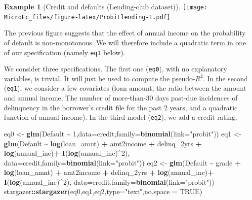 \documentclass[
  12pt,
]{book}
\newenvironment{Shaded}{\begin{snugshade}}{\end{snugshade}}
\newcommand{\AttributeTok}[1]{\textcolor[rgb]{0.13,0.29,0.53}{#1}}
\newcommand{\ConstantTok}[1]{\textcolor[rgb]{0.56,0.35,0.01}{#1}}
\newcommand{\DecValTok}[1]{\textcolor[rgb]{0.00,0.00,0.81}{#1}}
\newcommand{\FunctionTok}[1]{\textcolor[rgb]{0.13,0.29,0.53}{\textbf{#1}}}
\newcommand{\NormalTok}[1]{#1}
\newcommand{\OtherTok}[1]{\textcolor[rgb]{0.56,0.35,0.01}{#1}}
\newcommand{\SpecialCharTok}[1]{\textcolor[rgb]{0.81,0.36,0.00}{\textbf{#1}}}
\newcommand{\StringTok}[1]{\textcolor[rgb]{0.31,0.60,0.02}{#1}}
\theoremstyle{definition}
\theoremstyle{definition}
\newtheorem{example}{Example}[chapter]
\theoremstyle{definition}
\theoremstyle{definition}
\theoremstyle{remark}
\begin{document}
\begin{example}[Credit and defaults (Lending-club dataset)]
\texttt{[image: MicroEc\_files/figure-latex/Probitlending-1.pdf]}

The previous figure suggests that the effect of annual income on the probability of default is non-monotonous. We will therefore include a quadratic term in one of our specification (namely \texttt{eq1} below).

We consider three specifications. The first one (\texttt{eq0}), with no explanatory variables, is trivial. It will just be used to compute the pseudo-\(R^2\). In the second (\texttt{eq1}), we consider a few covariates (loan amount, the ratio between the amount and annual income, The number of more-than-30 days past-due incidences of delinquency in the borrower's credit file for the past 2 years, and a quadratic function of annual income). In the third model (\texttt{eq2}), we add a credit rating.

\begin{Shaded}
\begin{Highlighting}[]
\NormalTok{eq0 }\OtherTok{\textless{}{-}} \FunctionTok{glm}\NormalTok{(Default }\SpecialCharTok{\textasciitilde{}} \DecValTok{1}\NormalTok{,}\AttributeTok{data=}\NormalTok{credit,}\AttributeTok{family=}\FunctionTok{binomial}\NormalTok{(}\AttributeTok{link=}\StringTok{"probit"}\NormalTok{))}
\NormalTok{eq1 }\OtherTok{\textless{}{-}} \FunctionTok{glm}\NormalTok{(Default }\SpecialCharTok{\textasciitilde{}} \FunctionTok{log}\NormalTok{(loan\_amnt) }\SpecialCharTok{+}\NormalTok{ amt2income }\SpecialCharTok{+}\NormalTok{ delinq\_2yrs }\SpecialCharTok{+} 
             \FunctionTok{log}\NormalTok{(annual\_inc)}\SpecialCharTok{+} \FunctionTok{I}\NormalTok{(}\FunctionTok{log}\NormalTok{(annual\_inc)}\SpecialCharTok{\^{}}\DecValTok{2}\NormalTok{),}
           \AttributeTok{data=}\NormalTok{credit,}\AttributeTok{family=}\FunctionTok{binomial}\NormalTok{(}\AttributeTok{link=}\StringTok{"probit"}\NormalTok{))}
\NormalTok{eq2 }\OtherTok{\textless{}{-}} \FunctionTok{glm}\NormalTok{(Default }\SpecialCharTok{\textasciitilde{}}\NormalTok{ grade }\SpecialCharTok{+} \FunctionTok{log}\NormalTok{(loan\_amnt) }\SpecialCharTok{+}\NormalTok{ amt2income }\SpecialCharTok{+}\NormalTok{ delinq\_2yrs }\SpecialCharTok{+} 
             \FunctionTok{log}\NormalTok{(annual\_inc)}\SpecialCharTok{+} \FunctionTok{I}\NormalTok{(}\FunctionTok{log}\NormalTok{(annual\_inc)}\SpecialCharTok{\^{}}\DecValTok{2}\NormalTok{),}
           \AttributeTok{data=}\NormalTok{credit,}\AttributeTok{family=}\FunctionTok{binomial}\NormalTok{(}\AttributeTok{link=}\StringTok{"probit"}\NormalTok{))}
\NormalTok{stargazer}\SpecialCharTok{::}\FunctionTok{stargazer}\NormalTok{(eq0,eq1,eq2,}\AttributeTok{type=}\StringTok{"text"}\NormalTok{,}\AttributeTok{no.space =} \ConstantTok{TRUE}\NormalTok{)}
\end{Highlighting}
\end{Shaded}


\end{example}
\end{document}
